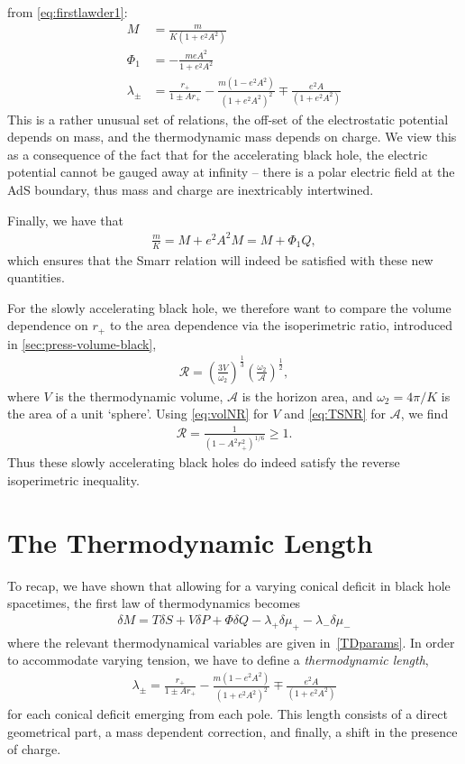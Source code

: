 \documentclass[
twoside,
openright,
frontopenright
]{dmathesis}
\newcommand{\nn}{\nonumber}
\begin{document}
from \cref{eq:firstlawder1}:
\begin{align}
M &= \frac{m}{K(1+e^2 A^2)} \nn\\
\Phi_1 &= -\frac{meA^2}{1+e^2 A^2}\nn\\
\lambda_\pm &= \frac{r_+}{1\pm Ar_+} - \frac{m(1-e^2A^2)}{(1+e^2 A^2)^2} 
\mp \frac{e^2A}{(1+e^2 A^2)}
\label{TDparams}
\end{align}
This is a rather unusual set of relations, the off-set of the electrostatic
potential depends on mass, and the thermodynamic mass depends on charge. We view
this as a consequence of the fact that for the accelerating black hole, the
electric potential cannot be gauged away at infinity -- there is a polar
electric field at the AdS boundary, thus mass and charge are inextricably
intertwined.

Finally, we have that
\begin{align}
  \frac{m}{K} = M+e^2A^2M = M+\Phi_1Q,
\end{align}
which ensures that the Smarr relation will indeed be satisfied with these new
quantities.

For the slowly accelerating black hole, we therefore want to compare the volume
dependence on $r_+$ to the area dependence via the isoperimetric ratio,
introduced in \cref{sec:press-volume-black},
\begin{align}
\mathcal{R}=\left(\frac{3V}{\omega_{2}}\right)^\frac13
  \left(\frac{\omega_{2}}{\mathcal{A}}\right)^\frac12, 
\end{align}
where $V$ is the thermodynamic volume, $\mathcal{A}$ is the horizon area, and
$\omega_2=4\pi/K$ is the area of a unit `sphere'.  Using \cref{eq:volNR} for
$V$ and \cref{eq:TSNR} for $\mathcal{A}$, we find
\begin{align}
\mathcal{R}=\frac{1}{(1-A^2r_+^2)^{1/6}}\geqslant 1.
\end{align}
Thus these slowly accelerating black holes do indeed satisfy the
reverse isoperimetric inequality.

\section{The Thermodynamic Length}

To recap, we have shown that allowing for a varying conical deficit
in black hole spacetimes, the first law of thermodynamics becomes
\begin{align}
\delta M = T \delta S + V\delta P + \Phi \delta Q - \lambda_+ \delta \mu_+
- \lambda_- \delta \mu_-
\end{align}
where the relevant thermodynamical variables are given in~\eqref{TDparams}.
In order to accommodate varying 
tension, we have to define a {\it thermodynamic length},
\begin{align}
\lambda_\pm = \frac{r_+}{1\pm Ar_+} - \frac{m(1-e^2A^2)}{(1+e^2 A^2)^2} 
\mp \frac{e^2A}{(1+e^2 A^2)}
\end{align}
for each conical deficit emerging from each pole. This length consists of 
a direct geometrical part, a mass dependent correction, and finally, a shift
in the presence of charge.
\end{document}
